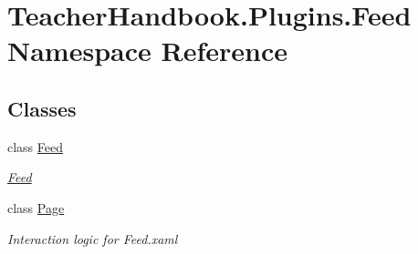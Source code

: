\hypertarget{namespace_teacher_handbook_1_1_plugins_1_1_feed}{}\section{Teacher\+Handbook.\+Plugins.\+Feed Namespace Reference}
\label{namespace_teacher_handbook_1_1_plugins_1_1_feed}
\subsection*{Classes}
\begin{DoxyCompactItemize}
\item 
class \mbox{\hyperlink{class_teacher_handbook_1_1_plugins_1_1_feed_1_1_feed}{Feed}}
\begin{DoxyCompactList}\small\item\em \mbox{\hyperlink{class_teacher_handbook_1_1_plugins_1_1_feed_1_1_feed}{Feed}} \end{DoxyCompactList}\item 
class \mbox{\hyperlink{class_teacher_handbook_1_1_plugins_1_1_feed_1_1_page}{Page}}
\begin{DoxyCompactList}\small\item\em Interaction logic for Feed.\+xaml \end{DoxyCompactList}\end{DoxyCompactItemize}
